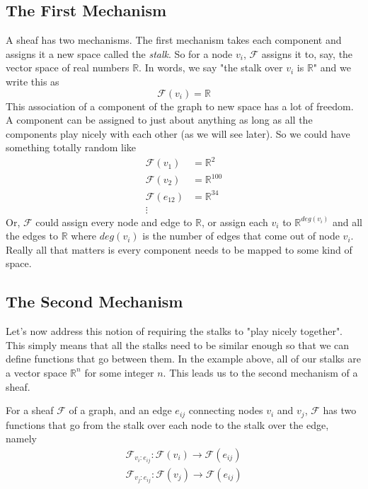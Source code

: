 \documentclass{tufte-handout}
\newcommand{\F}{\mathcal{F}}
\newcommand{\R}{\mathbb{R}}
\begin{document}
\subsection{The First Mechanism}

A sheaf has two mechanisms. The first mechanism takes each component and assigns it a new space called the \emph{stalk}. So for a node $v_i$, $\F$ assigns it to, say, the vector space of real numbers $\R$. In words, we say "the stalk over $v_i$ is $\R$" and we write this as 
\[
    \F(v_i) = \R
\]
This association of a component of the graph to new space has a lot of freedom. A component can be assigned to just about anything as long as all the components play nicely with each other (as we will see later). So we could have something totally random like
\begin{align*}
    \F(v_1) &= \R^2 \\
    \F(v_2) &= \R^{100} \\
    \F(e_{12}) &= \R^{34} \\
    \vdots
\end{align*}  
Or, $\F$ could assign every node and edge to $\R$, or assign each $v_i$ to $\R^{deg(v_i)}$ and all the edges to $\R$ where $deg(v_i)$ is the number of edges that come out of node $v_i$. Really all that matters is every component needs to be mapped to some kind of space.

\subsection{The Second Mechanism}

Let's now address this notion of requiring the stalks to "play nicely together". This simply means that all the stalks need to be similar enough so that we can define functions that go between them. In the example above, all of our stalks are a vector space $\R^n$ for some integer $n$. This leads us to the second mechanism of a sheaf. 

For a sheaf $\F$ of a graph, and an edge $e_{ij}$ connecting nodes $v_i$ and $v_j$, $\F$ has two functions that go from the stalk over each node to the stalk over the edge, namely
\begin{align*}
    \F_{v_i:e_{ij}}: \F(v_i) \rightarrow \F(e_{ij}) \\
    \F_{v_j:e_{ij}}: \F(v_j) \rightarrow \F(e_{ij})
\end{align*}
\end{document}
